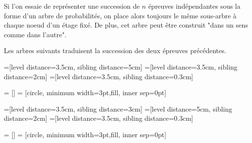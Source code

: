 \documentclass[11pt,fleqn, openany]{book} %
\begin{document}
Si l'on essaie de représenter une succession de $n$ épreuves indépendantes sous la forme d'un arbre de probabilités, on place alors toujours le même sous-arbre à chaque noeud d'un étage fixé. De plus, cet arbre peut être construit "dans un sens comme dans l'autre".
\newpage
\begin{example}Les arbres suivants traduisent la succession des deux épreuves précédentes. 


\noindent\begin{minipage}{0.49\linewidth}
=[level distance=3.5cm, sibling distance=5cm]
=[level distance=3.5cm, sibling distance=2cm]
=[level distance=3.5cm, sibling distance=0.3cm]

 = []
 = [circle, minimum width=3pt,fill, inner sep=0pt]


\begin{center}
\end{center}
\end{minipage} \begin{minipage}{0.49\linewidth}
=[level distance=3.5cm, sibling distance=3cm]
=[level distance=5cm, sibling distance=2cm]
=[level distance=3.5cm, sibling distance=0.3cm]

 = []
 = [circle, minimum width=3pt,fill, inner sep=0pt]



\end{minipage}
\end{example}
\end{document}
